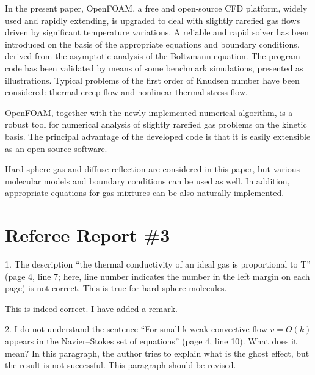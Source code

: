 \documentclass{article}
\begin{document}
\begin{leftbar}
In the present paper, OpenFOAM\textregistered{}, a free and open-source CFD platform,
widely used and rapidly extending, is upgraded to deal with
slightly rarefied gas flows driven by significant temperature variations.
A reliable and rapid solver has been introduced on the basis of the appropriate
equations and boundary conditions, derived from the asymptotic analysis of the Boltzmann equation.
The program code has been validated by means of some benchmark simulations,
presented as illustrations. Typical problems of the first order of Knudsen number
have been considered: thermal creep flow and nonlinear thermal-stress flow.

OpenFOAM\textregistered{}, together with the newly implemented numerical algorithm,
is a robust tool for numerical analysis of slightly rarefied gas problems
on the kinetic basis. The principal advantage of the developed code is that
it is easily extensible as an open-source software.

Hard-sphere gas and diffuse reflection are considered in this paper,
but various molecular models and boundary conditions can be used as well.
In addition, appropriate equations for gas mixtures can be also naturally implemented.
\end{leftbar}

\section{Referee Report \#3}

\begin{quoting}
1. The description ``the thermal conductivity of an ideal gas is
proportional to T'' (page 4, line 7; here, line number indicates the
number in the left margin on each page) is not correct. This is true for
hard-sphere molecules.
\end{quoting}

This is indeed correct. I have added a remark. 

\begin{quoting}
2. I do not understand the sentence ``For small k weak convective flow \(v
= O(k)\) appears in the Navier--Stokes set of equations'' (page 4, line 10).
What does it mean? In this paragraph, the author tries to explain what
is the ghost effect, but the result is not successful. This paragraph
should be revised.
\end{quoting}
\end{document}
